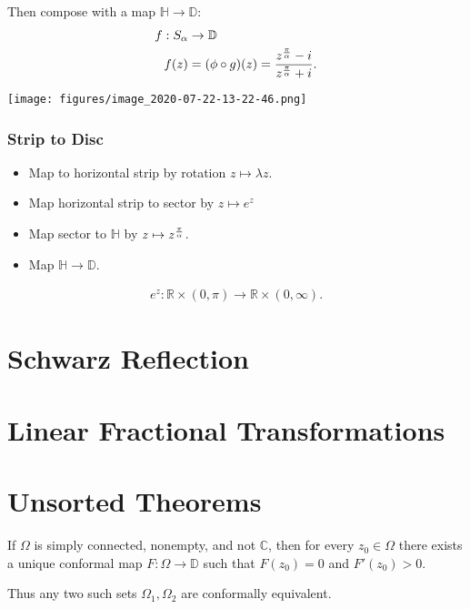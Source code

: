Then compose with a map \({\mathbb{H}}\to{\mathbb{D}}\):
\begin{align*}
f: S_\alpha &\to {\mathbb{D}}\\
f(z) &= (\phi \circ g)(z) = {z^{\pi\over \alpha} - i \over z^{\pi\over\alpha} + i}
.\end{align*}

\texttt{[image: figures/image\_2020-07-22-13-22-46.png]}

\hypertarget{strip-to-disc}{%
\subsubsection{Strip to Disc}\label{strip-to-disc}}

\begin{itemize}
\tightlist
\item
  Map to horizontal strip by rotation \(z\mapsto \lambda z\).
\item
  Map horizontal strip to sector by \(z \mapsto e^z\)
\item
  Map sector to \({\mathbb{H}}\) by \(z\mapsto z^{\pi\over\alpha}\).
\item
  Map \({\mathbb{H}}\to{\mathbb{D}}\).
\end{itemize}

\begin{align*}
e^z: {\mathbb{R}}\times(0, \pi) \to {\mathbb{R}}\times(0, \infty)
.\end{align*}

\hypertarget{schwarz-reflection}{%
\section{Schwarz Reflection}\label{schwarz-reflection}}

\hypertarget{linear-fractional-transformations-1}{%
\section{Linear Fractional
Transformations}\label{linear-fractional-transformations-1}}

\hypertarget{unsorted-theorems}{%
\section{Unsorted Theorems}\label{unsorted-theorems}}

\begin{theorem}

If \(\Omega\) is simply connected, nonempty, and not \({\mathbb{C}}\),
then for every \(z_{0}\in \Omega\) there exists a unique conformal map
\(F:\Omega \to {\mathbb{D}}\) such that \(F(z_{0}) = 0\) and
\(F'(z_{0}) > 0\).

Thus any two such sets \(\Omega_{1}, \Omega_{2}\) are conformally
equivalent.

\end{theorem}

